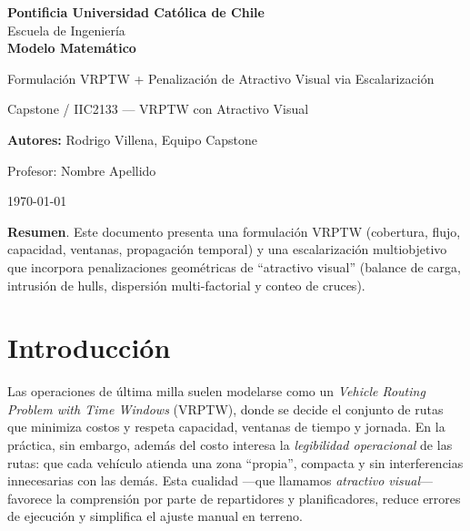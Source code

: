 \documentclass[11pt, a4paper]{article}
\newcommand{\universidad}{Pontificia Universidad Católica de Chile}
\newcommand{\escuela}{Escuela de Ingeniería}
\newcommand{\curso}{Capstone / IIC2133 — VRPTW con Atractivo Visual}
\newcommand{\titulo}{Modelo Matemático}
\newcommand{\subtitulo}{Formulación VRPTW + Penalización de Atractivo Visual via Escalarización}
\newcommand{\autores}{Rodrigo Villena, Equipo Capstone}
\newcommand{\profesor}{Profesor: Nombre Apellido}
\newcommand{\fecha}{\today}
\newcommand{\logoPath}{figs/logo_uc.png} %
\begin{document}
\begin{titlepage}
    \centering

    {\Large \textbf{\universidad}}\\[0.2cm]
    {\large \escuela}\\[1.8cm]

    {\LARGE \textbf{\titulo}}\par
    \vspace{0.2cm}
    {\large \subtitulo}\par
    \vspace{1.4cm}

    {\large \curso}\par
    \vspace{1.2cm}

    {\large \textbf{Autores:}} {\autores}\par
    \vspace{0.4cm}
    {\large \profesor}\par
    \vspace{1.6cm}

    {\large \fecha}\par

    \vfill

    \begin{flushleft}
        \textbf{Resumen}. Este documento presenta una formulación VRPTW  (cobertura, flujo, capacidad, ventanas, propagación temporal)
        y una escalarización multiobjetivo que incorpora penalizaciones geométricas
        de “atractivo visual” (balance de carga, intrusión de hulls, dispersión
        multi-factorial y conteo de cruces).
    \end{flushleft}
\end{titlepage}

\tableofcontents
\newpage

\section{Introducción}
Las operaciones de última milla suelen modelarse como un \emph{Vehicle Routing Problem with Time Windows} (VRPTW), donde se decide el conjunto de rutas que minimiza costos y respeta capacidad, ventanas de tiempo y jornada. En la práctica, sin embargo, además del costo interesa la \emph{legibilidad operacional} de las rutas: que cada vehículo atienda una zona “propia”, compacta y sin interferencias innecesarias con las demás. Esta cualidad —que llamamos \emph{atractivo visual}— favorece la comprensión por parte de repartidores y planificadores, reduce errores de ejecución y simplifica el ajuste manual en terreno.
\end{document}
